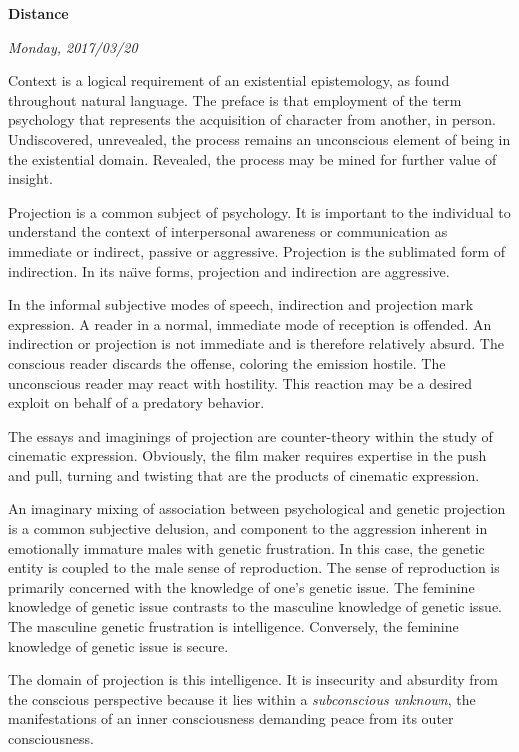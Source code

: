 

\centerline{\bf Distance}
\centerline{\it Monday, 2017/03/20}



\vfill
\break

Context is a logical requirement of an existential epistemology, as
found throughout natural language.  \break The preface is that
employment of the term psychology that represents the acquisition of
character from another, in person.  Undiscovered, unrevealed, the
process remains an unconscious element of being in the existential
domain.  Revealed, the process may be mined for further value of
insight.

Projection is a common subject of psychology.  It is important to the
individual to understand the context of interpersonal awareness or
communication as immediate or indirect, passive or aggressive.
Projection is the sublimated form of indirection.  In its na\"{\i}ve
forms, projection and indirection are aggressive.  

In the informal subjective modes of speech, indirection and projection
mark expression.  A reader in a normal, immediate mode of reception is
offended.  An indirection or projection is not immediate and is
therefore relatively absurd.  The conscious reader discards the
offense, coloring the emission hostile.  The unconscious reader may
react with hostility.  This reaction may be a desired exploit on
behalf of a predatory behavior.

The essays and imaginings of projection are \break counter-theory
within the study of cinematic expression.  Obviously, the film maker
requires expertise in the push and pull, turning and twisting that are
the products of cinematic expression.

An imaginary mixing of association between psychological and genetic
projection is a common subjective delusion, and component to the
aggression inherent in emotionally immature males with genetic
frustration.  In this case, the genetic entity is coupled to the male
sense of reproduction.  The sense of reproduction is primarily
concerned with the knowledge of one's genetic issue.  The feminine
knowledge of genetic issue contrasts to the masculine knowledge of
genetic issue.  The masculine genetic frustration is intelligence.
Conversely, the feminine knowledge of genetic issue is secure.

The domain of projection is this intelligence.  It is insecurity and
absurdity from the conscious perspective because it lies within a {\it
subconscious unknown}, the manifestations of an inner consciousness
demanding peace from its outer consciousness.  

